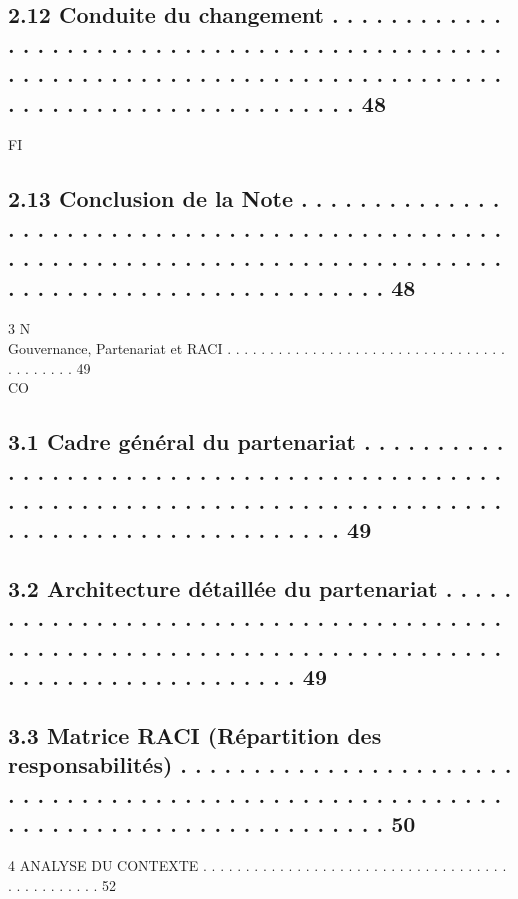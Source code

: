 \documentclass[12pt,landscape,a4paper]{article}
\begin{document}
\subsection{2.12    Conduite du changement . . . . . . . . . . . . . . . . . . . . . . . . . . . . . . . . . . . . . . . . . . . . . . . . . . . . . . . . . . . . . . . . . . . . . . . . . . . . . . . . . . . . . . . . . . . . . . . . . . . . . . . . 48}
\vspace{0.5em}
\vspace{0.5em}
\vspace{0.5em}
\vspace{0.5em}
FI\\
\subsection{2.13    Conclusion de la Note . . . . . . . . . . . . . . . . . . . . . . . . . . . . . . . . . . . . . . . . . . . . . . . . . . . . . . . . . . . . . . . . . . . . . . . . . . . . . . . . . . . . . . . . . . . . . . . . . . . . . . . . . . . . 48}
\vspace{0.5em}
3                                                                                  N\\
Gouvernance, Partenariat et RACI . . . . . . . . . . . . . . . . . . . . . . . . . . . . . . . . . . . . . . . . . 49\\
CO\\
\subsection{3.1     Cadre général du partenariat . . . . . . . . . . . . . . . . . . . . . . . . . . . . . . . . . . . . . . . . . . . . . . . . . . . . . . . . . . . . . . . . . . . . . . . . . . . . . . . . . . . . . . . . . . . . . . . . . . . . . 49}
\subsection{3.2     Architecture détaillée du partenariat . . . . . . . . . . . . . . . . . . . . . . . . . . . . . . . . . . . . . . . . . . . . . . . . . . . . . . . . . . . . . . . . . . . . . . . . . . . . . . . . . . . . . . . . . . . . . 49}
\subsection{3.3     Matrice RACI (Répartition des responsabilités) . . . . . . . . . . . . . . . . . . . . . . . . . . . . . . . . . . . . . . . . . . . . . . . . . . . . . . . . . . . . . . . . . . . . . . . . . . . . . . . . . . . 50}
\vspace{0.5em}
4     ANALYSE DU CONTEXTE . . . . . . . . . . . . . . . . . . . . . . . . . . . . . . . . . . . . . . . . . . . . . . . 52\\
\end{document}
